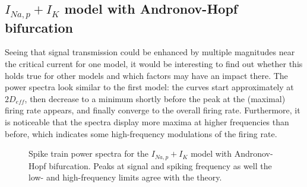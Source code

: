 \documentclass[12pt,a4paper]{article}
\begin{document}
\subsection{$I_{Na,p}+I_K$ model with Andronov-Hopf bifurcation}
Seeing that signal transmission could be enhanced by multiple magnitudes near the critical current for one model, it would be interesting to find out whether this holds true for other models and which factors may have an impact there. The power spectra look similar to the first model: the curves start approximately at $2D_{eff}$, then decrease to a minimum shortly before the peak at the (maximal) firing rate appears, and finally converge to the overall firing rate. Furthermore, it is noticeable that the spectra display more maxima at higher frequencies than before, which indicates some high-frequency modulations of the firing rate.
\begin{figure}[H]
	\label{anhopfspec}
	\hspace*{-0.5cm}
	\caption{Spike train power spectra for the $I_{Na,p}+I_K$ model with Andronov-Hopf bifurcation. Peaks at signal and spiking frequency as well the low- and high-frequency limits agree with the theory.}
\end{figure}
\end{document}

